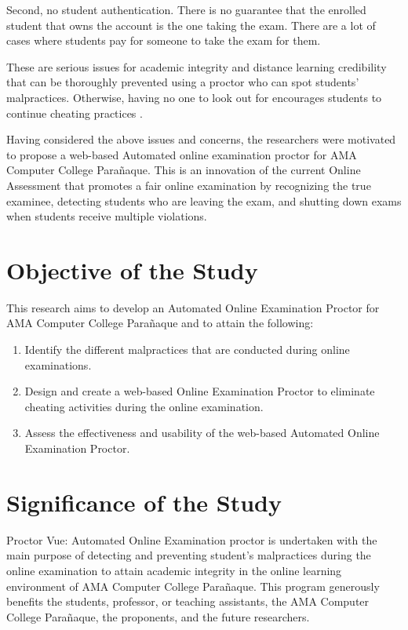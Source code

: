 Second, no student authentication.
There is no guarantee that the enrolled student that owns the account is the one taking the exam.
There are a lot of cases where students pay for someone to take the exam for them.

These are serious issues for academic integrity and distance learning credibility that can be thoroughly prevented using a proctor who can spot students' malpractices.
Otherwise, having no one to look out for encourages students to continue cheating practices \cite{teh2013reducing}.

Having considered the above issues and concerns, the researchers were motivated to propose a web-based Automated online examination proctor for AMA Computer College Parañaque.
This is an innovation of the current Online Assessment that promotes a fair online examination by recognizing the true examinee, detecting students who are leaving the exam, and shutting down exams when students receive multiple violations.

\section{Objective of the Study}
This research aims to develop an Automated Online Examination Proctor for AMA Computer College Parañaque and to attain the following:
\begin{enumerate}
   \item Identify the different malpractices that are conducted during online examinations.
   \item Design and create a web-based Online Examination Proctor to eliminate cheating activities during the online examination.
   \item Assess the effectiveness and usability of the web-based Automated Online Examination Proctor.
\end{enumerate}

\section{Significance of the Study}

Proctor Vue: Automated Online Examination proctor is undertaken with the main purpose of detecting and preventing student's malpractices during the online examination to attain academic integrity in the online learning environment of AMA Computer College Parañaque.
This program generously benefits the students, professor, or teaching assistants, the AMA Computer College Parañaque, the proponents, and the future researchers.

